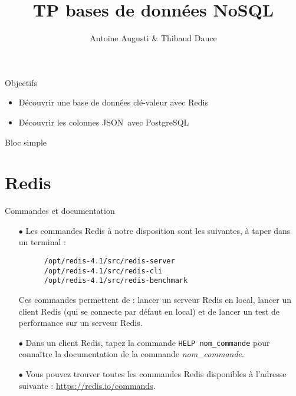 \documentclass[a4paper,10pt]{article}
\title{TP bases de données NoSQL}
\date{}
\author{Antoine Augusti \& Thibaud Dauce}
\begin{document}
\maketitle
\sloppy
\begin{bclogo}[logo = \bclampe, arrondi = 0.1, ombre = true, epOmbre = 0.2, couleurOmbre = black!30, couleurBord=bleuF, barre=none]{Objectifs}
\begin{itemize}
 \item Découvrir une base de données clé-valeur avec Redis
 \item Découvrir les colonnes JSON avec PostgreSQL
\end{itemize}

\end{bclogo}


\begin{bclogo}[logo = \bccrayon, noborder=true,barre=none]{}
  Bloc simple
\end{bclogo}

\section{Redis}
  \begin{bclogo}[logo = \bctakecare, arrondi = 0.1, ombre = true , epOmbre = 0.1, couleurOmbre = black!30,  barre =none, couleurBarre=bleuF]{Commandes et documentation}
    \begin{itemize}
    \item[$\bullet$] Les commandes Redis à notre disposition sont les suivantes, à taper dans un terminal :
    \begin{verbatim}
      /opt/redis-4.1/src/redis-server
      /opt/redis-4.1/src/redis-cli
      /opt/redis-4.1/src/redis-benchmark
    \end{verbatim}
    \item[] Ces commandes permettent de : lancer un serveur Redis en local, lancer un client Redis (qui se connecte par défaut en local) et de lancer un test de performance sur un serveur Redis.
    \item[$\bullet$] Dans un client Redis, tapez la commande \texttt{HELP nom\_commande} pour connaître la documentation de la commande \textit{nom\_commande}.
    \item[$\bullet$] Vous pouvez trouver toutes les commandes Redis disponibles à l'adresse suivante : \url{https://redis.io/commands}.

   \end{itemize}
  \end{bclogo}
\end{document}
